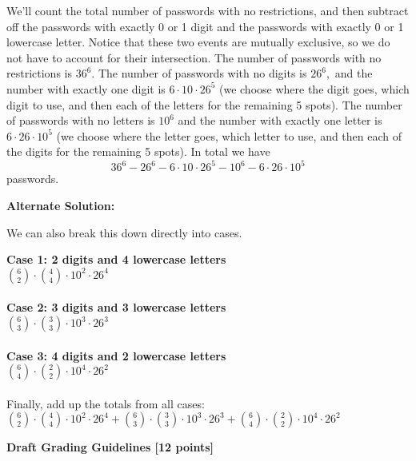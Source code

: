 \documentclass[12pt]{exam}
\begin{document}
\begin{solution}
We'll count the total number of passwords with no restrictions, and then subtract off the passwords with exactly 0 or 1 digit and the passwords with exactly 0 or 1 lowercase letter. Notice that these two events are mutually exclusive, so we do not have to account for their intersection. The number of passwords with no restrictions is $36^6.$ The number of passwords with no digits is $26^6,$ and the number with exactly one digit is $6\cdot 10\cdot 26^5$ (we choose where the digit goes, which digit to use, and then each of the letters for the remaining 5 spots). The number of passwords with no letters is $10^6$ and the number with exactly one letter is $6\cdot 26\cdot 10^5$ (we choose where the letter goes, which letter to use, and then each of the digits for the remaining 5 spots). In total we have
$$36^6-26^6-6\cdot 10\cdot 26^5-10^6 - 6\cdot 26\cdot 10^5$$
passwords.

\textbf{Alternate Solution:}

We can also break this down directly into cases.

\textbf{Case 1: 2 digits and 4 lowercase letters}\\
$\binom{6}{2} \cdot \binom{4}{4} \cdot 10^2 \cdot 26^4$ \\ \\

\textbf{Case 2: 3 digits and 3 lowercase letters}\\
$\binom{6}{3} \cdot \binom{3}{3} \cdot 10^3 \cdot 26^3$\\ \\

\textbf{Case 3: 4 digits and 2 lowercase letters}\\
$\binom{6}{4} \cdot \binom{2}{2} \cdot 10^4 \cdot 26^2$ \\ \\

Finally, add up the totals from all cases:\\
$\binom{6}{2} \cdot \binom{4}{4} \cdot 10^2 \cdot 26^4 + \binom{6}{3} \cdot \binom{3}{3} \cdot 10^3 \cdot 26^3 + \binom{6}{4} \cdot \binom{2}{2} \cdot 10^4 \cdot 26^2$


\smallskip

\textbf{Draft Grading Guidelines [12 points]}


\end{solution}
\end{document}
